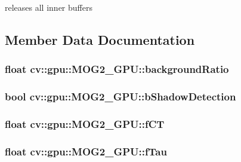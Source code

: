 releases all inner buffers 



\subsection{Member Data Documentation}
\hypertarget{classcv_1_1gpu_1_1MOG2__GPU_ab646673e679c021d6971eeba1b44abfa}{
\subsubsection[{background\-Ratio}]{\setlength{\rightskip}{0pt plus 5cm}float cv\-::gpu\-::\-M\-O\-G2\-\_\-\-G\-P\-U\-::background\-Ratio}}\label{classcv_1_1gpu_1_1MOG2__GPU_ab646673e679c021d6971eeba1b44abfa}
\hypertarget{classcv_1_1gpu_1_1MOG2__GPU_ae7b0f3d5c29a710e4185ec1fb9335b96}{
\subsubsection[{b\-Shadow\-Detection}]{\setlength{\rightskip}{0pt plus 5cm}bool cv\-::gpu\-::\-M\-O\-G2\-\_\-\-G\-P\-U\-::b\-Shadow\-Detection}}\label{classcv_1_1gpu_1_1MOG2__GPU_ae7b0f3d5c29a710e4185ec1fb9335b96}
\hypertarget{classcv_1_1gpu_1_1MOG2__GPU_a2dd28f1330681ced7f872e0ae8b3f0ef}{
\subsubsection[{f\-C\-T}]{\setlength{\rightskip}{0pt plus 5cm}float cv\-::gpu\-::\-M\-O\-G2\-\_\-\-G\-P\-U\-::f\-C\-T}}\label{classcv_1_1gpu_1_1MOG2__GPU_a2dd28f1330681ced7f872e0ae8b3f0ef}
\hypertarget{classcv_1_1gpu_1_1MOG2__GPU_a0a1a2553c82bd821783e4840e4c9c6ee}{
\subsubsection[{f\-Tau}]{\setlength{\rightskip}{0pt plus 5cm}float cv\-::gpu\-::\-M\-O\-G2\-\_\-\-G\-P\-U\-::f\-Tau}}\label{classcv_1_1gpu_1_1MOG2__GPU_a0a1a2553c82bd821783e4840e4c9c6ee}

